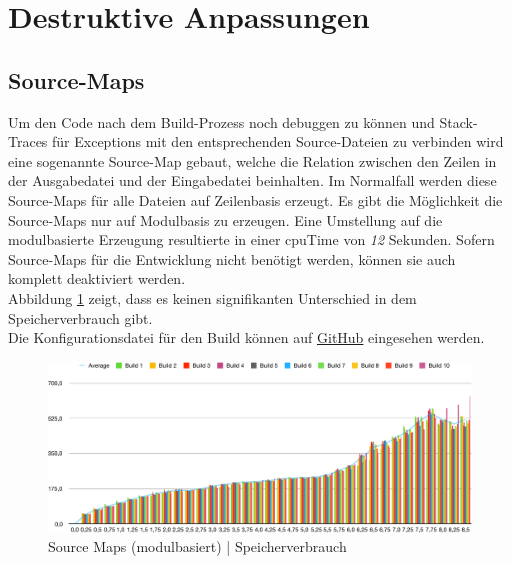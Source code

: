 \documentclass[11pt]{report}
\begin{document}
    	\section{Destruktive Anpassungen}
    		\subsection{Source-Maps}
    			Um den Code nach dem Build-Prozess noch debuggen zu können und Stack-Traces für Exceptions mit den entsprechenden Source-Dateien zu verbinden wird eine sogenannte Source-Map gebaut, welche die Relation zwischen den Zeilen in der Ausgabedatei und der Eingabedatei beinhalten. Im Normalfall werden diese Source-Maps für alle Dateien auf Zeilenbasis erzeugt. Es gibt die Möglichkeit die Source-Maps nur auf Modulbasis zu erzeugen. Eine Umstellung auf die modulbasierte Erzeugung resultierte in einer \Gls{cpuTime} von \emph{12} Sekunden. Sofern Source-Maps für die Entwicklung nicht benötigt werden, können sie auch komplett deaktiviert werden.\\
    			Abbildung \ref{figure:sourceMaps_memory} zeigt, dass es keinen signifikanten Unterschied in dem Speicherverbrauch gibt.\\
    			Die Konfigurationsdatei für den Build können auf \href{https://github.com/TexNAK/WebBundlerOptimization/compare/master...destr_cheapSourceMaps#diff-1fb5683b1e7adbcee273b7f9f9a08a22}{GitHub} eingesehen werden.

				\begin{figure}[p]
		            \includegraphics[width=\textwidth]{img/destr_sourceMaps_cheap_memory}
		            \caption{Source Maps (modulbasiert) | Speicherverbrauch}
		            \label{figure:sourceMaps_memory}
		        \end{figure}
\end{document}
